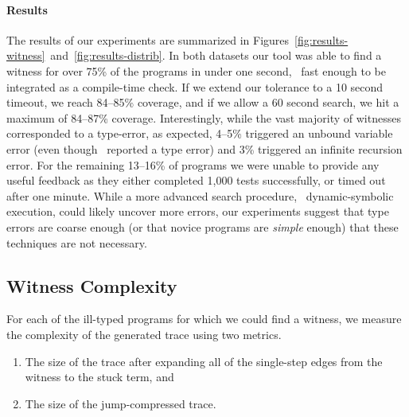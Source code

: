 \paragraph{Results}
\label{sec:results-witness}
The results of our experiments are summarized in
Figures~\ref{fig:results-witness}~and~\ref{fig:results-distrib}.
%
In both datasets our tool was able to find a witness for over 75\% of the
programs in under one second, \ie\ fast enough to be integrated as a
compile-time check. If we extend our tolerance to a 10 second timeout,
we reach 84--85\% coverage, and if we allow a 60 second search,
we hit a maximum of 84--87\% coverage.
%
Interestingly, while the vast majority of witnesses corresponded to a
type-error, as expected, 4--5\% triggered an unbound variable error (even
though \ocaml\ reported a type error) and 3\% triggered an infinite
recursion error.
%
For the remaining 13--16\% of programs we were unable to provide any useful
feedback as they either completed 1,000 tests successfully, or timed out
after one minute.
%
%
While a more advanced search procedure, \eg\ dynamic-symbolic execution,
could likely uncover more errors, our experiments suggest that
type errors are coarse enough (or that novice programs are \emph{simple}
enough) that these techniques are not necessary.




\subsection{Witness Complexity}
\label{sec:trace-complexity}

For each of the ill-typed programs for which we could
find a witness, we measure the complexity of the generated
trace using two metrics.

%
\begin{enumerate}
\item {} The size of the trace after expanding
  all of the single-step edges from the witness to the stuck term, and
\item {} The size of the jump-compressed trace.
\end{enumerate}


